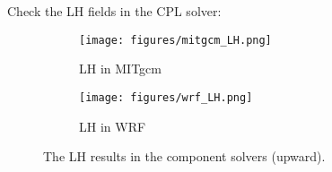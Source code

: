 
Check the LH fields in the CPL solver:

\begin{figure}[h!]
\centering
  \begin{subfigure}[b]{0.4\linewidth}
  \texttt{[image: figures/mitgcm\_LH.png]}
  \caption{LH in MITgcm}
  \end{subfigure}
  \begin{subfigure}[b]{0.4\linewidth}
  \texttt{[image: figures/wrf\_LH.png]}
  \caption{LH in WRF}
  \end{subfigure}
\caption{The LH results in the component solvers (upward).}
\label{fig:lh}
\end{figure}
